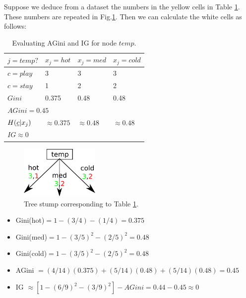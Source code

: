 Suppose we deduce from a dataset
the numbers in the yellow cells
in Table \ref{tab-temp-gini}.
These numbers are repeated in  Fig.\ref{fig-stump-3cildren}.
Then we can calculate the white cells as follows: 

\begin{table}[h!]
\centering
\begin{tabular}{|l|l|l|l|}
\hline
$j=temp?$ & \cellcolor[HTML]{CBCEFB}$x_j=hot$ & \cellcolor[HTML]{CBCEFB}$x_j=med$ & \cellcolor[HTML]{CBCEFB}$x_j=cold$ \\ \hline
\rowcolor[HTML]{FFFFC7} 
\cellcolor[HTML]{9AFF99}$c=play$ & 3 & 3 & 3 \\ \hline
\rowcolor[HTML]{FFFFC7} 
\cellcolor[HTML]{FFCCC9}$c=stay$ & 1 & 2 & 2 \\ \hline
$Gini$ & 0.375 & 0.48 & 0.48 \\ \hline
\multicolumn{4}{|l|}{$AGini=0.45$} \\ \hline
$H({\underline{c}}|x_j)$ & $\approx 0.375$ & $\approx 0.48$ & $\approx 0.48$ \\ \hline
\multicolumn{4}{|l|}{$IG\approx 0$} \\ \hline
\end{tabular}
\caption{Evaluating AGini and IG for node $temp$.}
\label{tab-temp-gini}
\end{table}



\begin{figure}[h!]
\centering
\includegraphics[width=1.5in]
{dtree/stump-3children.png}
\caption{Tree stump
corresponding to Table \ref{tab-temp-gini}.}
\label{fig-stump-3cildren}
\end{figure}



\begin{itemize}
\item Gini(hot)$=1-(3/4)-(1/4)=0.375$
\item Gini(med)$=1-(3/5)^2-(2/5)^2=0.48$
\item Gini(cold)$=1-(3/5)^2-(2/5)^2=0.48$
\item AGini $ = (4/14)(0.375)+
(5/14)(0.48) + (5/14)(0.48) = 0.45 $
\item IG $\approx [1 -(6/9)^2-(3/9)^2]-AGini= 
0.44-0.45\approx 0$
\end{itemize}

